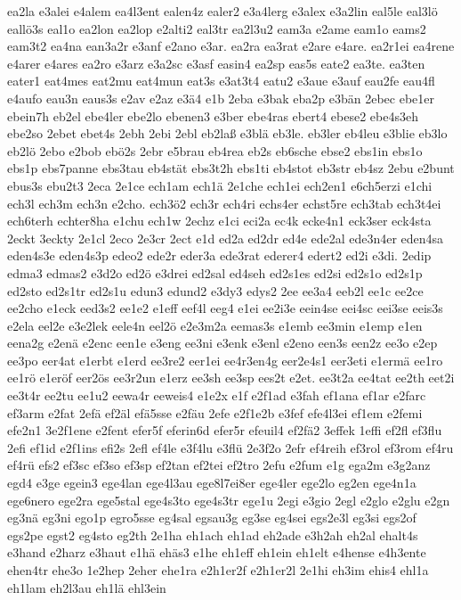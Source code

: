 {ea2la
e3alei
e4alem
ea4l3ent
ealen4z
ealer2
e3a4lerg
e3alex
e3a2lin
eal5le
eal3lö
eallö3s
eal1o
ea2lon
ea2lop
e2alti2
eal3tr
ea2l3u2
eam3a
e2ame
eam1o
eams2
eam3t2
ea4na
ean3a2r
e3anf
e2ano
e3ar.
ea2ra
ea3rat
e2are
e4are.
ea2r1ei
ea4rene
e4arer
e4ares
ea2ro
e3arz
e3a2sc
e3asf
easin4
ea2sp
eas5s
eate2
ea3te.
ea3ten
eater1
eat4mes
eat2mu
eat4mun
eat3s
e3at3t4
eatu2
e3aue
e3auf
eau2fe
eau4fl
e4aufo
eau3n
eaus3s
e2av
e2az
e3ä4
e1b
2eba
e3bak
eba2p
e3bän
2ebec
ebe1er
ebein7h
eb2el
ebe4ler
ebe2lo
ebenen3
e3ber
ebe4ras
ebert4
ebese2
ebe4s3eh
ebe2so
2ebet
ebet4s
2ebh
2ebi
2ebl
eb2laß
e3blä
eb3le.
eb3ler
eb4leu
e3blie
eb3lo
eb2lö
2ebo
e2bob
ebö2s
2ebr
e5brau
eb4rea
eb2s
eb6sche
ebse2
ebs1in
ebs1o
ebs1p
ebs7panne
ebs3tau
eb4stät
ebs3t2h
ebs1ti
eb4stot
eb3str
eb4sz
2ebu
e2bunt
ebus3s
ebu2t3
2eca
2e1ce
ech1am
ech1ä
2e1che
ech1ei
ech2en1
e6ch5erzi
e1chi
ech3l
ech3m
ech3n
e2cho.
ech3ö2
ech3r
ech4ri
echs4er
echst5re
ech3tab
ech3t4ei
ech6terh
echter8ha
e1chu
ech1w
2echz
e1ci
eci2a
ec4k
ecke4n1
eck3ser
eck4sta
2eckt
3eckty
2e1cl
2eco
2e3cr
2ect
e1d
ed2a
ed2dr
ed4e
ede2al
ede3n4er
eden4sa
eden4s3e
eden4s3p
edeo2
ede2r
eder3a
ede3rat
ederer4
edert2
ed2i
e3di.
2edip
edma3
edmas2
e3d2o
ed2ö
e3drei
ed2sal
ed4seh
ed2s1es
ed2si
ed2s1o
ed2s1p
ed2sto
ed2s1tr
ed2s1u
edun3
edund2
e3dy3
edys2
2ee
ee3a4
eeb2l
ee1c
ee2ce
ee2cho
e1eck
eed3s2
ee1e2
e1eff
eef4l
eeg4
e1ei
ee2i3e
eein4se
eei4sc
eei3se
eeis3s
e2ela
eel2e
e3e2lek
eele4n
eel2ö
e2e3m2a
eemas3s
e1emb
ee3min
e1emp
e1en
eena2g
e2enä
e2enc
een1e
e3eng
ee3ni
e3enk
e3enl
e2eno
een3s
een2z
ee3o
e2ep
ee3po
eer4at
e1erbt
e1erd
ee3re2
eer1ei
ee4r3en4g
eer2e4s1
eer3eti
e1ermä
ee1ro
ee1rö
e1eröf
eer2ös
ee3r2un
e1erz
ee3sh
ee3sp
ees2t
e2et.
ee3t2a
ee4tat
ee2th
eet2i
ee3t4r
ee2tu
ee1u2
eewa4r
eeweis4
e1e2x
e1f
e2f1ad
e3fah
ef1ana
ef1ar
e2farc
ef3arm
e2fat
2efä
ef2äl
efä5sse
e2fäu
2efe
e2f1e2b
e3fef
efe4l3ei
ef1em
e2femi
efe2n1
3e2f1ene
e2fent
efer5f
eferin6d
efer5r
efeuil4
ef2fä2
3effek
1effi
ef2fl
ef3flu
2efi
ef1id
e2f1ins
efi2s
2efl
ef4le
e3f4lu
e3flü
2e3f2o
2efr
ef4reih
ef3rol
ef3rom
ef4ru
ef4rü
efs2
ef3sc
ef3so
ef3sp
ef2tan
ef2tei
ef2tro
2efu
e2fum
e1g
ega2m
e3g2anz
egd4
e3ge
egein3
ege4lan
ege4l3au
ege8l7ei8er
ege4ler
ege2lo
eg2en
ege4n1a
ege6nero
ege2ra
ege5stal
ege4s3to
ege4s3tr
ege1u
2egi
e3gio
2egl
e2glo
e2glu
e2gn
eg3nä
eg3ni
ego1p
egro5sse
eg4sal
egsau3g
eg3se
eg4sei
egs2e3l
eg3si
egs2of
egs2pe
egst2
eg4sto
eg2th
2e1ha
eh1ach
eh1ad
eh2ade
e3h2ah
eh2al
ehalt4s
e3hand
e2harz
e3haut
e1hä
ehäs3
e1he
eh1eff
eh1ein
eh1elt
e4hense
e4h3ente
ehen4tr
ehe3o
1e2hep
2eher
ehe1ra
e2h1er2f
e2h1er2l
2e1hi
eh3im
ehis4
ehl1a
eh1lam
eh2l3au
eh1lä
ehl3ein
}
